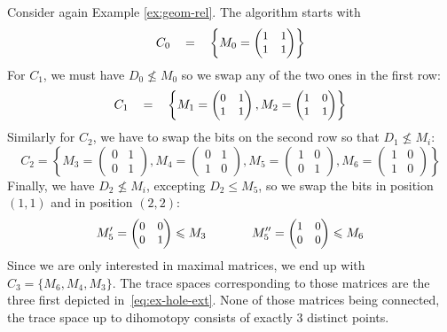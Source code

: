 \documentclass[orivec]{llncs} \usepackage[T1]{fontenc}
\newcommand\set[1]{\{#1\}}
\newcommand{\qeq}{\quad=\quad}
\renewcommand{\leq}{\leqslant}
\newcommand{\pa}[1]{\left(#1\right)}
\begin{document}
\begin{example}
  \label{exnaive}
  Consider again Example \ref{ex:geom-rel}.
The algorithm starts with
  \[
  \small
  C_0
  \qeq
  \left\{
    M_0=
    \pa{
      \begin{matrix}
        1&1\\
        1&1
      \end{matrix}
    }
  \right\}
  \]
  For $C_1$, we must have $D_0\not\leq M_0$ so we swap any of the two ones in the
  first row:
  \[
  \small
  C_1
  \qeq
  \left\{
    M_1=
    \pa{
      \begin{matrix}
        0 & 1 \\
        1 & 1
      \end{matrix}
    },
    M_2=
    \pa{
      \begin{matrix}
        1 & 0 \\
        1 & 1
      \end{matrix}
    }
  \right\}
  \]
  Similarly for $C_2$, we have to swap the bits on the second row so that
  $D_1\not\leq M_i$:
  \[
  C_2=
  \left\{
    M_3=
    \pa{
      \begin{matrix}
        0 &  1 \\
        0 &  1
      \end{matrix}
    },
    M_4=\pa{
      \begin{matrix}
        0 &  1 \\
        1 &  0
      \end{matrix}
    },
    M_5=\pa{
      \begin{matrix}
        1 &  0 \\
        0 &  1
      \end{matrix}
    },
    M_6=\pa{
      \begin{matrix}
        1 &  0 \\
        1 &  0
      \end{matrix}
    }
  \right\}
  \]
  Finally, we have $D_2\not\leq M_i$, excepting $D_2\leq M_5$, so we swap the
  bits in position $(1,1)$ and in position $(2,2)$:
  \[
  \small
  M_5'=\pa{
    \begin{matrix}
      0 & 0 \\
      0 & 1
      \end{matrix}
    }
    \leq M_3
    \qquad\qquad
    M_5''=\pa{
      \begin{matrix}
        1 & 0 \\
        0 & 0
      \end{matrix}
    }
    \leq M_6
  \]
  Since we are only interested in maximal matrices, we end up with
  $C_3=\set{M_6,M_4,M_3}$. The trace spaces corresponding to those matrices are
  the three first depicted in~\eqref{eq:ex-hole-ext}. None of those matrices
  being connected, the trace space up to dihomotopy consists of exactly 3
  distinct points.
\end{example}
\end{document}
